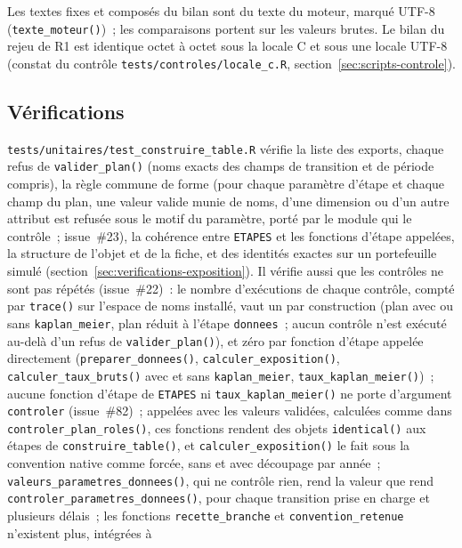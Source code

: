 \documentclass[a4paper,11pt]{article}
\newcommand{\code}[1]{\texttt{\small #1}}
\begin{document}
\noindent
Les textes fixes et composés du bilan sont du texte du moteur, marqué
UTF-8 (\code{texte\_moteur()})~; les comparaisons portent sur les valeurs
brutes. Le bilan du rejeu de R1 est identique octet à octet sous la locale
C et sous une locale UTF-8 (constat du contrôle
\code{tests/controles/locale\_c.R}, section~\ref{sec:scripts-controle}).\par
\endgroup

\subsection{Vérifications}
\label{sec:verifications-construction}

{\sloppy{} \code{tests/unitaires/test\_construire\_table.R} vérifie la liste des exports,
chaque refus de \code{valider\_plan()} (noms exacts des champs de transition et
de période compris), la règle commune de forme (pour chaque paramètre d'étape
et chaque champ du plan, une valeur valide munie de noms, d'une dimension ou
d'un autre attribut est refusée sous le motif du paramètre, porté par le
module qui le contrôle~; issue~\#23), la cohérence entre \code{ETAPES} et les fonctions
d'étape appelées, la structure de l'objet et de la fiche, et des identités
exactes sur un portefeuille simulé (section~\ref{sec:verifications-exposition}).
Il vérifie aussi que les contrôles ne sont pas répétés (issue~\#22)~: le
nombre d'exécutions de chaque contrôle, compté par \code{trace()} sur
l'espace de noms installé, vaut un par construction (plan avec ou sans
\code{kaplan\_meier}, plan réduit à l'étape \code{donnees}~; aucun contrôle
n'est exécuté au-delà d'un refus de \code{valider\_plan()}), et zéro par
fonction d'étape appelée directement (\code{preparer\_donnees()},
\code{calculer\_exposition()}, \code{calculer\_taux\_bruts()} avec et sans
\code{kaplan\_meier}, \code{taux\_kaplan\_meier()})~; aucune fonction
d'étape de \code{ETAPES} ni \code{taux\_kaplan\_meier()} ne porte
d'argument \code{controler} (issue~\#82)~; appelées avec les valeurs
validées, calculées comme dans \code{controler\_plan\_roles()}, ces
fonctions rendent des objets \code{identical()} aux étapes de
\code{construire\_table()}, et \code{calculer\_exposition()} le fait sous
la convention native comme forcée, sans et avec découpage par année~;
\code{valeurs\_parametres\_donnees()}, qui ne contrôle rien, rend la
valeur que rend \code{controler\_parametres\_donnees()}, pour chaque
transition prise en charge et plusieurs délais~; les fonctions
\code{recette\_branche} et \code{convention\_retenue} n'existent plus, intégrées à
}
\end{document}
